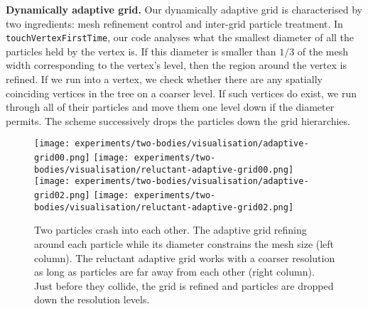 {\bf Dynamically adaptive grid.}
Our dynamically adaptive grid is characterised by two ingredients: mesh
refinement control and inter-grid particle treatment.
In \texttt{touchVertexFirstTime}, our code analyses what the smallest diameter
of all the particles held by the vertex is.
If this diameter is smaller than $1/3$ of the mesh width corresponding to the
vertex's level, then the region around the vertex is refined.
If we run into a vertex, we check whether there are any spatially coinciding
vertices in the tree on a coarser level.
If such vertices do exist, we run through all of their particles and move them
one level down if the diameter permits.
The scheme successively drops the particles down the grid hierarchies.

\begin{figure}
 \begin{center}
  \texttt{[image: experiments/two-bodies/visualisation/adaptive-grid00.png]}
  \hspace{1.1cm}
  \texttt{[image: experiments/two-bodies/visualisation/reluctant-adaptive-grid00.png]}
  \\
  \texttt{[image: experiments/two-bodies/visualisation/adaptive-grid02.png]}
  \hspace{1.1cm}
  \texttt{[image: experiments/two-bodies/visualisation/reluctant-adaptive-grid02.png]}
 \end{center}
 \caption{
   Two particles crash into each other.
   The adaptive grid refining around each particle while its diameter
   constrains the mesh size (left column).
   The reluctant adaptive grid works with a coarser resolution as long
   as particles are far away from each other (right column).
   Just before they collide, the grid is refined and particles are dropped down
   the resolution levels.
 }
 \label{figure:adaptive-vs-reluctant-grid}
\end{figure}


